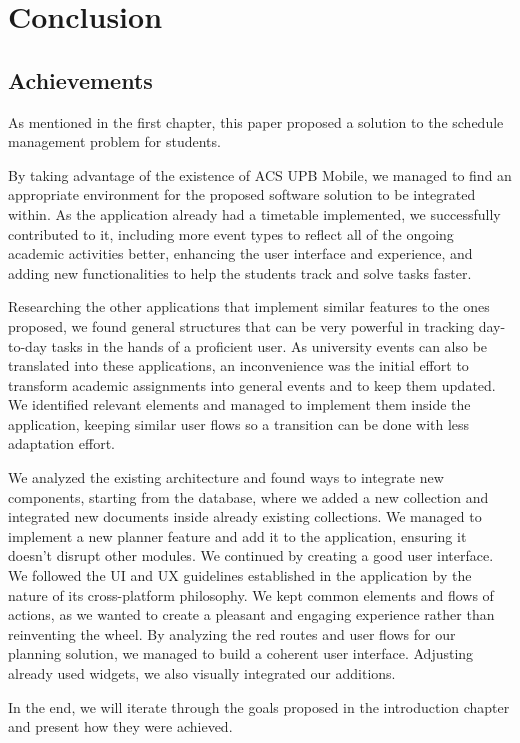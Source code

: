 \chapter{Conclusion } \label{chapter7}

\section{Achievements } \label{7:achivments}
As mentioned in the first chapter, this paper proposed a solution to the schedule management problem for students.

By taking advantage of the existence of ACS UPB Mobile, we managed to find an appropriate environment for the proposed software solution to be integrated within. As the application already had a timetable implemented, we successfully contributed to it, including more event types to reflect all of the ongoing academic activities better, enhancing the user interface and experience, and adding new functionalities to help the students track and solve tasks faster.

Researching the other applications that implement similar features to the ones proposed, we found general structures that can be very powerful in tracking day-to-day tasks in the hands of a proficient user. As university events can also be translated into these applications, an inconvenience was the initial effort to transform academic assignments into general events and to keep them updated. We identified relevant elements and managed to implement them inside the application, keeping similar user flows so a transition can be done with less adaptation effort. 

We analyzed the existing architecture and found ways to integrate new components, starting from the database, where we added a new collection and integrated new documents inside already existing collections. We managed to implement a new planner feature and add it to the application, ensuring it doesn’t disrupt other modules.
We continued by creating a good user interface. We followed the UI and UX guidelines established in the application by the nature of its cross-platform philosophy. We kept common elements and flows of actions, as we wanted to create a pleasant and engaging experience rather than reinventing the wheel. By analyzing the red routes and user flows for our planning solution, we managed to build a coherent user interface. Adjusting already used widgets, we also visually integrated our additions. 

In the end, we will iterate through the goals proposed in the introduction chapter and present how they were achieved. 

